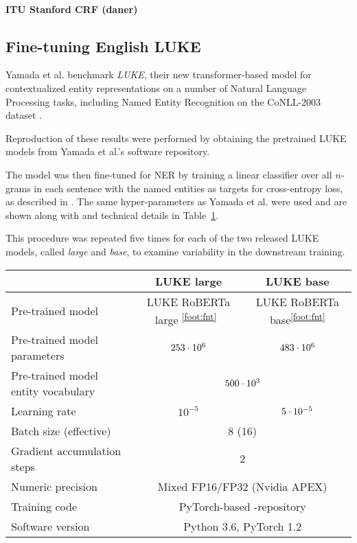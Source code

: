 \documentclass[main.tex]{subfiles}
\begin{document}
\paragraph{ITU Stanford CRF (daner)}

\subsection{Fine-tuning English LUKE}
Yamada et al. benchmark \emph{LUKE}, their new transformer-based model for contextualized entity representations on a number of Natural Language Processing tasks, including Named Entity Recognition on the CoNLL-2003 dataset \cite{yamada2020luke}.

Reproduction of these results were performed by obtaining the pretrained LUKE models from Yamada et al.'s software repository.

The model was then fine-tuned for NER by training a linear classifier over all $n$-grams in each sentence with the named entities as targets for cross-entropy loss, as described in \cite[Sec. 4.3]{yamada2020luke}.
The same hyper-parameters as Yamada et al. were used and are shown along with and technical details in Table~\ref{tab:params}.

This procedure was repeated five times for each of the two released LUKE models, called \emph{large} and \emph{base}, to examine variability in the downstream training.

\addtocounter{footnote}{1}
\begin{table}[H]
    \begin{tabular}{l|cc}
                                    & LUKE large & LUKE base\\\hline
        Pre-trained model
                                    & LUKE RoBERTa large \textsuperscript{\ref{foot:fnt}}\
                                                & LUKE RoBERTa base\textsuperscript{\ref{foot:fnt}}\\
        Pre-trained model parameters & $253\cdot10^{6}$ & $483\cdot10^{6}$\\
        Pre-trained model entity vocabulary & \multicolumn{2}{c}{$500\cdot10^{3}$}\\
        Learning rate               & $10^{-5}$ & $5\cdot10^{-5}$\\
        Batch size (effective)      & \multicolumn{2}{c}{8 (16)}\\
        Gradient accumulation steps & \multicolumn{2}{c}{2}\\
        Numeric precision           & \multicolumn{2}{c}{Mixed FP16/FP32 (Nvidia APEX)}\\
        Training code               & \multicolumn{2}{c}{PyTorch-based \code{luke}-repository \protect\footnotemark}\\
        Software version            & \multicolumn{2}{c}{Python 3.6, PyTorch 1.2}
    \end{tabular}
    \label{tab:params}
\end{table}
\end{document}

